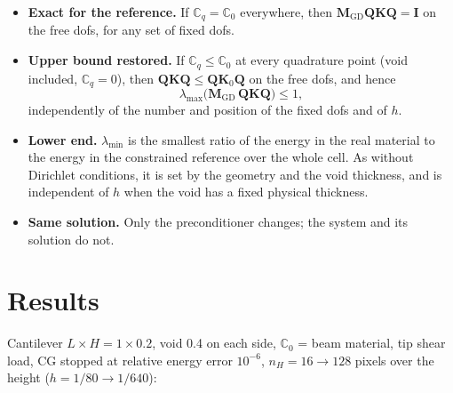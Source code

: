 \documentclass[11pt,a4paper]{article}
\begin{document}
\begin{itemize}
  \item \textbf{Exact for the reference.} If $\mathbb{C}_q = \mathbb{C}_0$ everywhere, then
        $\mathbf{M}_{\mathrm{GD}}\mathbf{Q}\mathbf{K}\mathbf{Q} = \mathbf{I}$ on the free dofs, for any set of fixed dofs.
  \item \textbf{Upper bound restored.} If $\mathbb{C}_q \le \mathbb{C}_0$ at every quadrature point (void included,
        $\mathbb{C}_q = 0$), then $\mathbf{Q}\mathbf{K}\mathbf{Q} \le \mathbf{Q}\mathbf{K}_0\mathbf{Q}$ on the free dofs, and hence
        \[
          \lambda_{\max}\bigl(\mathbf{M}_{\mathrm{GD}}\,\mathbf{Q}\mathbf{K}\mathbf{Q}\bigr) \le 1 ,
        \]
        independently of the number and position of the fixed dofs and of $h$.
  \item \textbf{Lower end.} $\lambda_{\min}$ is the smallest ratio of the energy in the real material to the energy in
        the constrained reference over the whole cell. As without Dirichlet conditions, it is set by the geometry and
        the void thickness, and is independent of $h$ when the void has a fixed physical thickness.
  \item \textbf{Same solution.} Only the preconditioner changes; the system and its solution do not.
\end{itemize}

\section*{Results}

Cantilever $L\times H = 1\times0.2$, void 0.4 on each side, $\mathbb{C}_0$ = beam material, tip shear load, CG stopped at
relative energy error $10^{-6}$, $n_H = 16 \to 128$ pixels over the height ($h = 1/80 \to 1/640$):
\end{document}
